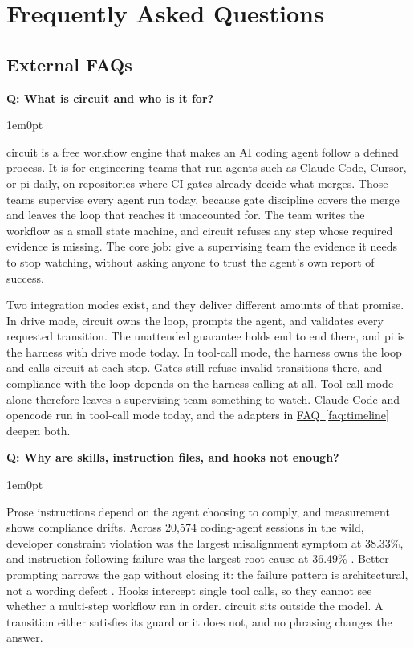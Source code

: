 \documentclass[11pt,letterpaper]{article}
\newcounter{faqnum}
\newenvironment{faqpair}[1]{%
  \needspace{4\baselineskip}%
  \vspace{0.5em}%
  \refstepcounter{faqnum}%
  \noindent\textbf{\color{SectionBlue}Q\thefaqnum: #1}\par\nopagebreak[4]%
  \vspace{0.2em}%
  \begin{adjustwidth}{1em}{0pt}%
  \setlength{\parindent}{0pt}%
}{%
  \end{adjustwidth}%
  \vspace{0.5em}%
}
\newcommand{\faqref}[1]{\hyperref[#1]{FAQ~\ref*{#1}}}
\begin{document}
\newpage


\section*{Frequently Asked Questions}


\subsection*{External FAQs}

\begin{faqpair}{What is circuit and who is it for?}
\label{faq:what}
  circuit is a free workflow engine that makes an AI coding agent follow a defined process. It is for engineering teams that run agents such as Claude Code, Cursor, or pi daily, on repositories where CI gates already decide what merges. Those teams supervise every agent run today, because gate discipline covers the merge and leaves the loop that reaches it unaccounted for. The team writes the workflow as a small state machine, and circuit refuses any step whose required evidence is missing. The core job: give a supervising team the evidence it needs to stop watching, without asking anyone to trust the agent's own report of success.

  Two integration modes exist, and they deliver different amounts of that promise. In drive mode, circuit owns the loop, prompts the agent, and validates every requested transition. The unattended guarantee holds end to end there, and pi is the harness with drive mode today. In tool-call mode, the harness owns the loop and calls circuit at each step. Gates still refuse invalid transitions there, and compliance with the loop depends on the harness calling at all. Tool-call mode alone therefore leaves a supervising team something to watch. Claude Code and opencode run in tool-call mode today, and the adapters in \faqref{faq:timeline} deepen both.
\end{faqpair}

\begin{faqpair}{Why are skills, instruction files, and hooks not enough?}
\label{faq:soft-mechanisms}
  Prose instructions depend on the agent choosing to comply, and measurement shows compliance drifts. Across 20,574 coding-agent sessions in the wild, developer constraint violation was the largest misalignment symptom at 38.33\%, and instruction-following failure was the largest root cause at 36.49\% \cite{tang2026codingagentmisalignment}. Better prompting narrows the gap without closing it: the failure pattern is architectural, not a wording defect \cite{cemri2025masttaxonomy}. Hooks intercept single tool calls, so they cannot see whether a multi-step workflow ran in order. circuit sits outside the model. A transition either satisfies its guard or it does not, and no phrasing changes the answer.
\end{faqpair}
\end{document}
